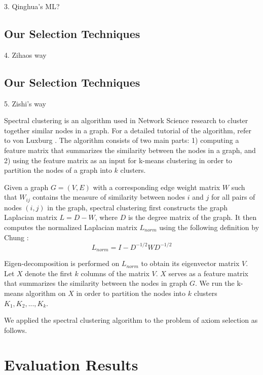 \documentclass[EPiC]{easychair}
\begin{document}
3. Qinghua's ML?
\subsection{Our Selection Techniques}
\label{Zihao}

4. Zihaos way
\subsection{Our Selection Techniques}
\label{Zishi}

5. Zishi's way

Spectral clustering is an algorithm used in Network Science research to
cluster together similar nodes in a graph. For a detailed tutorial of the 
algorithm, refer to von Luxburg \cite{vonLuxburg2007}. The algorithm consists 
of two main parts: 1) computing a feature matrix that summarizes the 
similarity between the nodes in a graph, and 2) using the feature matrix as
an input for k-means clustering in order to partition the nodes of a graph
into $k$ clusters.

Given a graph $G = (V, E)$ with a corresponding edge weight matrix $W$ such 
that $W_{ij}$ contains the measure of similarity between nodes $i$ and $j$ 
for all pairs of nodes $(i, j)$ in the graph, spectral clustering first 
constructs the graph Laplacian matrix $L = D - W$, where $D$ is the degree 
matrix of the graph. It then computes the normalized Laplacian matrix 
$L_{norm}$ using the following definition by Chung \cite{Chung1997}:
$$
L_{norm} = I - D^{-1/2} W D^{-1/2}
$$

Eigen-decomposition is performed on $L_{norm}$ to obtain its eigenvector
matrix $V$. Let $X$ denote the first $k$ columns of the matrix $V$. 
$X$ serves as a feature matrix that summarizes the similarity between the 
nodes in graph $G$. We run the k-means algorithm on $X$ in order to partition
the nodes into $k$ clusters $K_{1}, K_{2}, ..., K_{k}$.

We applied the spectral clustering algorithm to the problem of axiom 
selection as follows.

\section{Evaluation Results}
\label{Results}
\end{document}
